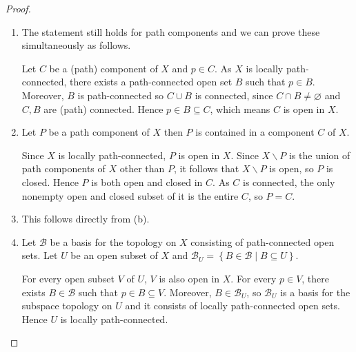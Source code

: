 \begin{proof}
    \begin{enumerate}[itemsep=0pt,label={(\alph*)}]
        \item The statement still holds for path components and we can prove these simultaneously as follows.

              Let \( C \) be a (path) component of \( X \) and \( p \in C \). As \( X \) is locally path-connected, there exists a path-connected open set \( B \) such that \( p \in B \). Moreover, \( B \) is path-connected so \( C \cup B \) is connected, since \( C \cap B \ne \varnothing \) and \( C, B \) are (path) connected. Hence \( p \in B \subseteq C \), which means \( C \) is open in \( X \).
        \item Let \( P \) be a path component of \( X \) then \( P \) is contained in a component \( C \) of \( X \).

              Since \( X \) is locally path-connected, \( P \) is open in \( X \). Since \( X \smallsetminus P \) is the union of path components of \( X \) other than \( P \), it follows that \( X \smallsetminus P \) is open, so \( P \) is closed. Hence \( P \) is both open and closed in \( C \). As \( C \) is connected, the only nonempty open and closed subset of it is the entire \( C \), so \( P = C \).
        \item This follows directly from (b).
        \item Let \( \mathcal{B} \) be a basis for the topology on \( X \) consisting of path-connected open sets. Let \( U \) be an open subset of \( X \) and \( \mathcal{B}_{U} = \left\{ B \in \mathcal{B} \mid B \subseteq U \right\} \).

              For every open subset \( V \) of \( U \), \( V \) is also open in \( X \). For every \( p \in V \), there exists \( B \in \mathcal{B} \) such that \( p \in B \subseteq V \). Moreover, \( B \in \mathcal{B}_{U} \), so \( \mathcal{B}_{U} \) is a basis for the subspace topology on \( U \) and it consists of locally path-connected open sets. Hence \( U \) is locally path-connected.
    \end{enumerate}
\end{proof}

